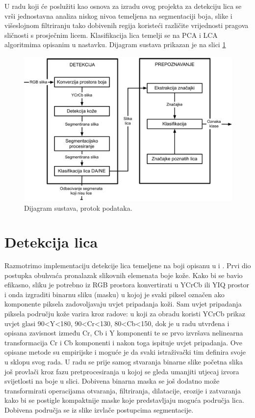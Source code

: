\documentclass[times, utf8, seminar, numeric]{fer}
\begin{document}
U radu koji će poslužiti kao osnova za izradu ovog projekta \cite{conf/isda/ChandrappaR12} za detekciju lica se vrši jednostavna analiza niskog nivoa temeljena na segmentaciji boja, slike i višeslojnom filtriranju tako dobivenih regija koristeći različite vrijednosti pragova sličnosti s prosječnim licem. Klasifikacija lica temelji se na PCA i LCA algoritmima opisanim u nastavku. Dijagram sustava prikazan je na slici \ref{fig:diagram}

\begin{figure}[!htb]
\centering
\includegraphics[width=\textwidth]{raw/Diagram.pdf}
\caption{Dijagram sustava, protok podataka.}
\label{fig:diagram}
\end{figure}

\section{Detekcija lica}
\label{sec:predlozeno_detekcija}

Razmotrimo implementaciju detekcije lica temeljene na boji opisanu u \cite{Senior:2002:FDC:513073.513082} i \cite{conf/isda/ChandrappaR12}. Prvi dio postupka obuhvaća pronalazak slikovnih elemenata boje kože. Kako bi se bavio efikasno, sliku je potrebno iz RGB prostora konvertirati u YCrCb ili YIQ prostor i onda izgraditi binarnu sliku (masku) u kojoj je svaki piksel označen ako komponente piksela zadovoljavaju uvjet pripadanja koži. Sam uvjet pripadanja piksela području kože varira kroz radove: u \cite{rahman_face_det_gender_svm} koji za obradu koristi YCrCb prikaz uvjet glasi 90<Y<180, 90<Cr<130, 80<Cb<150, dok je u radu \cite{Senior:2002:FDC:513073.513082} utvrđena i opisana zavisnost između Cr, Cb i Y komponenti te se prvo izvršava nelinearna transformacija Cr i Cb komponenti i nakon toga ispituje uvjet pripadanja. Ove opisane metode su empirijske i moguće je da svaki istraživački tim definira svoje u sklopu svog rada. U radu \cite{Senior:2002:FDC:513073.513082} se prije samog stvaranja binarne slike početna slika još provlači kroz fazu pretprocesiranja u kojoj se gleda umanjiti utjecaj izvora svijetlosti na boje u slici. Dobivena binarna maska se  još dodatno može transformirati operacijama otvaranja, filtriranja, dilatacije, erozije i zatvaranja kako bi se postigle kompaktnije maske koje predstavljaju moguća područja lica. Dobivena područja se iz slike izvlače postupcima segmentacije.
\end{document}
